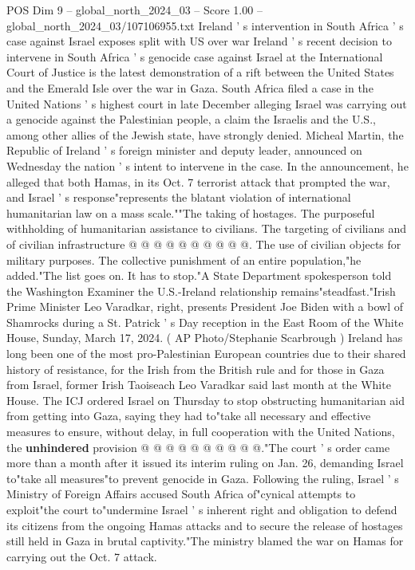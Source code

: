\begin{textsample}{POS Dim 9 – global\_north\_2024\_03 – Score 1.00 – global\_north\_2024\_03/107106955.txt}  \label{ex:f9_pos_273}
Ireland ' s intervention in South Africa ' s case against Israel exposes split with US over war Ireland ' s recent decision to intervene in South Africa ' s genocide case against Israel at the International Court of Justice is the latest demonstration of a rift between the United States and the Emerald Isle over the war in Gaza.
South Africa filed a case in the United Nations ' s highest court in late December alleging Israel was carrying out a genocide against the Palestinian people, a claim the Israelis and the U.S., among other allies of the Jewish state, have strongly denied.
Micheal Martin, the Republic of Ireland ' s foreign minister and deputy leader, announced on Wednesday the nation ' s intent to intervene in the case.
In the announcement, he alleged that both Hamas, in its Oct. 7 terrorist attack that prompted the war, and Israel ' s response"represents the blatant violation of international humanitarian law on a mass scale.""The taking of hostages.
The purposeful withholding of humanitarian assistance to civilians.
The targeting of civilians and of civilian infrastructure @ @ @ @ @ @ @ @ @ @.
The use of civilian objects for military purposes.
The collective punishment of an entire population,"he added."The list goes on.
It has to stop."A State Department spokesperson told the Washington Examiner the U.S.-Ireland relationship remains"steadfast."Irish Prime Minister Leo Varadkar, right, presents President Joe Biden with a bowl of Shamrocks during a St.
Patrick ' s Day reception in the East Room of the White House, Sunday, March 17, 2024. ( AP Photo/Stephanie Scarbrough ) Ireland has long been one of the most pro-Palestinian European countries due to their shared history of resistance, for the Irish from the British rule and for those in Gaza from Israel, former Irish Taoiseach Leo Varadkar said last month at the White House.
The ICJ ordered Israel on Thursday to stop obstructing humanitarian aid from getting into Gaza, saying they had to"take all necessary and effective measures to ensure, without delay, in full cooperation with the United Nations, the \textbf{unhindered} provision @ @ @ @ @ @ @ @ @ @."The court ' s order came more than a month after it issued its interim ruling on Jan. 26, demanding Israel to"take all measures"to prevent genocide in Gaza.
Following the ruling, Israel ' s Ministry of Foreign Affairs accused South Africa of"cynical attempts to exploit"the court to"undermine Israel ' s inherent right and obligation to defend its citizens from the ongoing Hamas attacks and to secure the release of hostages still held in Gaza in brutal captivity."The ministry blamed the war on Hamas for carrying out the Oct. 7 attack.

\end{textsample}
